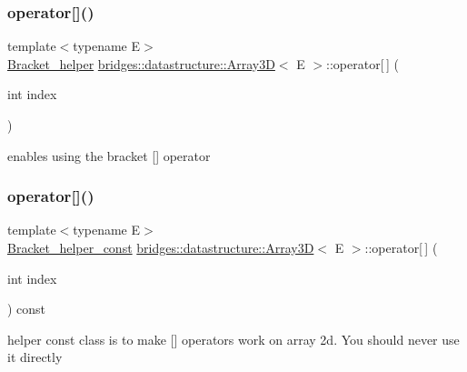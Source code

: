 \subsubsection{\texorpdfstring{operator[]()}{operator[]()}\hspace{0.1cm}{\footnotesize\ttfamily [1/2]}}
{\footnotesize\ttfamily template$<$typename E$>$ \\
\hyperlink{structbridges_1_1datastructure_1_1_array3_d_1_1_bracket__helper}{Bracket\+\_\+helper} \hyperlink{classbridges_1_1datastructure_1_1_array3_d}{bridges\+::datastructure\+::\+Array3D}$<$ E $>$\+::operator\mbox{[}$\,$\mbox{]} (\begin{DoxyParamCaption}\item[{int}]{index }\end{DoxyParamCaption})\hspace{0.3cm}{\ttfamily [inline]}}



enables using the bracket \mbox{[}\mbox{]} operator 

\mbox{\label{classbridges_1_1datastructure_1_1_array3_d_acfc0446c919e7ca70cc31d0624b3bcd1}} 
\subsubsection{\texorpdfstring{operator[]()}{operator[]()}\hspace{0.1cm}{\footnotesize\ttfamily [2/2]}}
{\footnotesize\ttfamily template$<$typename E$>$ \\
\hyperlink{structbridges_1_1datastructure_1_1_array3_d_1_1_bracket__helper__const}{Bracket\+\_\+helper\+\_\+const} \hyperlink{classbridges_1_1datastructure_1_1_array3_d}{bridges\+::datastructure\+::\+Array3D}$<$ E $>$\+::operator\mbox{[}$\,$\mbox{]} (\begin{DoxyParamCaption}\item[{int}]{index }\end{DoxyParamCaption}) const\hspace{0.3cm}{\ttfamily [inline]}}



helper const class is to make \mbox{[}\mbox{]} operators work on array 2d. You should never use it directly 

